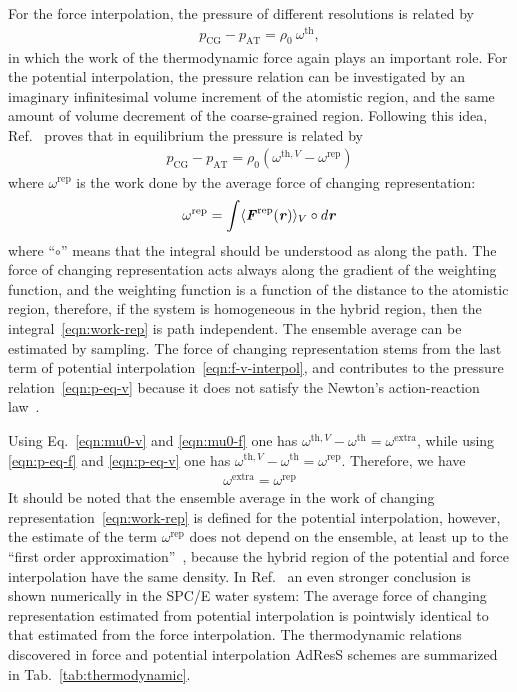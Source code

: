 \documentclass[epjST]{svjour}
\newcommand{\vect}[1]{\textbf{\textit{#1}}}
\newcommand{\AT}[0]{\textrm{AT}}
\newcommand{\CG}[0]{\textrm{CG}}
\newcommand{\thf}{{\textrm{th}}}
\newcommand{\rep}{{\textrm{rep}}}
\newcommand{\exc}{{\textrm{extra}}}
\begin{document}
For the force interpolation, the pressure of different resolutions
is related by~\cite{fritsch2012adaptive}
\begin{align}\label{eqn:p-eq-f}
  p_\CG - p_\AT = \rho_0 \:\omega^{\thf},
\end{align}
in which the work of the thermodynamic force again plays an important
role.  For the potential interpolation, the pressure relation can be
investigated by an imaginary infinitesimal volume increment of the atomistic
region, and the same amount of volume decrement of the coarse-grained
region. Following this idea, Ref.~\cite{agarwal2014chemical} proves that in
equilibrium the pressure is related by
\begin{align}\label{eqn:p-eq-v}
  p_\CG - p_\AT = \rho_0 (\omega^{\thf,V} - \omega^\rep)  
\end{align}
where $\omega^\rep$ is the work done by the average force of changing representation:
\begin{align}\label{eqn:work-rep}
  \omega^\rep = \int \langle \vect F^\rep(\vect r)\rangle_V\circ d\vect r
\end{align}
where ``$\circ$'' means that the integral should be understood as along the path.
The force of changing representation acts always along the gradient of the weighting
function, and the weighting function is a function of the distance to the atomistic region,
therefore, if the system is homogeneous in the hybrid region, then the integral~\eqref{eqn:work-rep}
is path independent. The ensemble average  can be estimated by sampling.
The force of changing representation stems from the last term of potential
interpolation~\eqref{eqn:f-v-interpol}, and contributes to the
pressure relation~\eqref{eqn:p-eq-v} because it does not satisfy the Newton's action-reaction
law~\cite{agarwal2014chemical}.

Using Eq.~\eqref{eqn:mu0-v} and \eqref{eqn:mu0-f} one has $\omega^{\thf,V} - \omega^\thf = \omega^\exc$,
while using \eqref{eqn:p-eq-f} and \eqref{eqn:p-eq-v} one has $\omega^{\thf,V} - \omega^\thf = \omega^\rep$.
Therefore, we have 
\begin{align}
  \omega^\exc = \omega^\rep
\end{align}
It should be noted that the ensemble average in the work
of changing representation~\eqref{eqn:work-rep} is defined for the
potential interpolation, however, the estimate of the term
$\omega^\rep$ does not depend on the ensemble, at least up to the
``first order approximation''~\cite{agarwal2014chemical}, because the
hybrid region of the potential and force interpolation have the same
density. In Ref.~\cite{wang2013grand} an even stronger conclusion is shown numerically in the SPC/E water system: The
average force of changing representation estimated from potential
interpolation is pointwisly identical to that estimated from the force
interpolation. The thermodynamic relations discovered in
force and potential interpolation AdResS schemes are summarized
in Tab.~\ref{tab:thermodynamic}.
\end{document}
